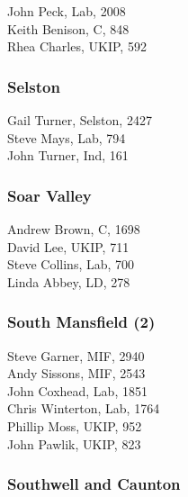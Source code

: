 \documentclass[a4paper,openany,10pt]{book}
\begin{document}


John Peck, Lab, 2008\\
Keith Benison, C, 848\\
Rhea Charles, UKIP, 592\\


\subsubsection*{Selston}



Gail Turner, Selston, 2427\\
Steve Mays, Lab, 794\\
John Turner, Ind, 161\\


\subsubsection*{Soar Valley}



Andrew Brown, C, 1698\\
David Lee, UKIP, 711\\
Steve Collins, Lab, 700\\
Linda Abbey, LD, 278\\


\subsubsection*{South Mansfield (2)}



Steve Garner, MIF, 2940\\
Andy Sissons, MIF, 2543\\
John Coxhead, Lab, 1851\\
Chris Winterton, Lab, 1764\\
Phillip Moss, UKIP, 952\\
John Pawlik, UKIP, 823\\


\subsubsection*{Southwell and Caunton}

\end{document}
